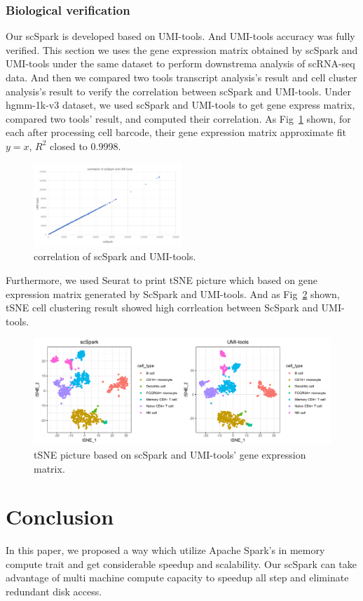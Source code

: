 \documentclass[conference]{IEEEtran}
\begin{document}
  \subsubsection{Biological verification}
  Our scSpark is developed based on UMI-tools. 
  And UMI-tools accuracy was fully verified. 
  This section we uses the gene expression matrix obtained by scSpark and UMI-tools under the same dataset to perform downstrema analysis of scRNA-seq data. 
  And then we compared two tools transcript analysis's result and cell cluster analysis's result to verify the correlation between scSpark and UMI-tools. 
  Under hgmm-1k-v3 dataset, we used scSpark and UMI-tools to get gene express matrix, compared two tools' result, and computed their correlation. 
  As Fig~\ref{fig9} shown, for each after processing cell barcode, their gene expression matrix approximate fit $y=x$, $R^{2}$ closed to 0.9998. 
  \begin{figure}
    \includegraphics[width=0.5\textwidth]{fig9.pdf}
    \caption{correlation of scSpark and UMI-tools.} \label{fig9}
  \end{figure}
  Furthermore, we used Seurat to print tSNE picture which based on gene expression matrix generated by ScSpark and UMI-tools. 
  And as Fig~\ref{fig10} shown, tSNE cell clustering result showed high corrleation between ScSpark and UMI-tools. 
  \begin{figure}
    \includegraphics[width=\textwidth]{fig10.pdf}
    \caption{tSNE picture based on scSpark and UMI-tools' gene expression matrix.} \label{fig10}
  \end{figure}
  \section{Conclusion}
  In this paper, we proposed a way which utilize Apache Spark's in memory compute trait and get considerable speedup and scalability. 
  Our scSpark can take advantage of multi machine compute capacity to speedup all step and eliminate redundant disk access. 
  
\end{document}
